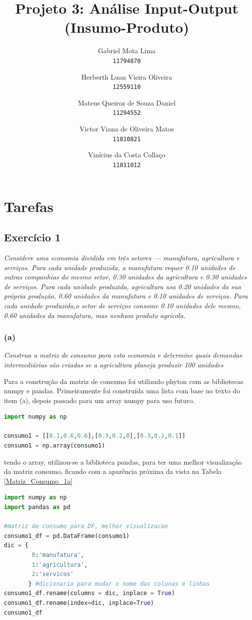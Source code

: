 \documentclass[a4paper, 12pt]{article}
\title{Projeto 3: Análise Input-Output (Insumo-Produto)}
\author{
  Gabriel Mota Lima\\
  \texttt{11794870}
  \and
  Herberth Luan Vieira Oliveira\\
  \texttt{12559110}
  \and
  Mateus Queiroz de Souza Daniel\\
  \texttt{11294552}
  \and
  Victor Viana de Oliveira Matos\\
  \texttt{11810821}
  \and
  Vinícius da Costa Collaço\\
  \texttt{11811012}
}
\begin{document}
\maketitle

\section{Tarefas}
\subsection{Exercício 1}

\textit{Considere  uma  economia  dividida  em  três  setores  —  manufatura,  agricultura  e  serviços.   Para  cada  unidade  produzida,  a  manufatura  requer 0.10  unidades  de  outras  companhias  do  mesmo  setor,  0.30  unidades  da agricultura e 0.30 unidades de serviços.  Para cada unidade produzida, agricultura usa 0.20 unidades da sua própria produção, 0.60 unidades da manufatura  e  0.10  unidades  de  serviços.   Para  cada  unidade  produzida,o setor de serviços consome 0.10 unidades dele mesmo, 0.60 unidades da manufatura, mas nenhum produto agrícola.}

\subsubsection{(a)}

\textit {Construa a matriz de consumo para esta economia e determine quais demandas intermediárias são criadas se a agricultura planeja produzir 100 unidades}

Para a construção da matriz de consumo foi utilizado phyton com as bibliotecas numpy e pandas. Primeiramente foi construída uma lista com base no texto do item (a), depois passado para um array numpy para uso futuro. 


\begin{lstlisting}[language=Python, caption=Construção da Matriz Consumo 1.a, label=listing_MatrizConsumo1a] 
import numpy as np

consumo1 = [[0.1,0.6,0.6],[0.3,0.2,0],[0.3,0.1,0.1]]
consumo1 = np.array(consumo1)
\end{lstlisting}

tendo o array, utilizou-se a biblioteca pandas, para ter uma melhor visualização da matriz consumo, ficando com a aparência próxima da vista na Tabela \ref{Matriz_Consumo_1a}

\begin{lstlisting}[language=Python, caption=Construção da Matriz Consumo 1.a - Visualização, label=listing_MatrizConsumo1aViz] 
import numpy as np
import pandas as pd

#matriz de consumo para DF, melhor visualizacao
consumo1_df = pd.DataFrame(consumo1)
dic = { 
        0:'manufatura',
        1:'agricultura',
        2:'servicos'
       } #dicionario para mudar o nome das colunas e linhas
consumo1_df.rename(columns = dic, inplace = True)
consumo1_df.rename(index=dic, inplace=True)
consumo1_df


\end{lstlisting}
\end{document}
